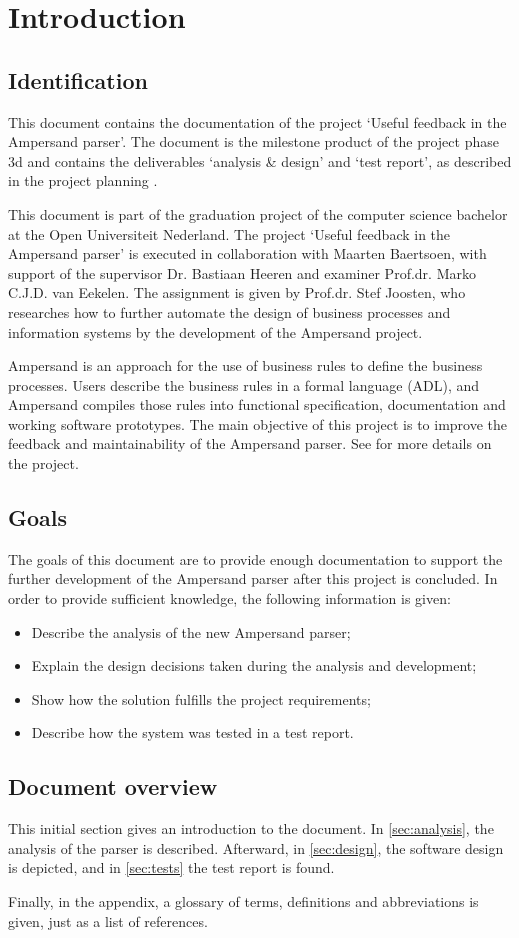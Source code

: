 \section{Introduction}
\subsection{Identification}
This document contains the documentation of the project `Useful feedback in the Ampersand parser'.
The document is the milestone product of the project phase 3d and contains the deliverables `analysis \& design' and `test report', as described in the project planning .

This document is part of the graduation project of the computer science bachelor at the Open Universiteit Nederland.
The project `Useful feedback in the Ampersand parser' is executed in collaboration with Maarten Baertsoen, with support of the supervisor Dr. Bastiaan Heeren and examiner Prof.dr. Marko C.J.D. van Eekelen.
The assignment is given by Prof.dr. Stef Joosten, who researches how to further automate the design of business processes and information systems by the development of the Ampersand project.

Ampersand is an approach for the use of business rules to define the business processes.
Users describe the business rules in a formal language (ADL), and Ampersand compiles those rules into functional specification, documentation and working software prototypes.
The main objective of this project is to improve the feedback and maintainability of the Ampersand parser.
See  for more details on the project.

\subsection{Goals}
The goals of this document are to provide enough documentation to support the further development of the Ampersand parser after this project is concluded.
In order to provide sufficient knowledge, the following information is given:
\begin{itemize}
  \item Describe the analysis of the new Ampersand parser;
  \item Explain the design decisions taken during the analysis and development;
  \item Show how the solution fulfills the project requirements;
  \item Describe how the system was tested in a test report.
\end{itemize}

\subsection{Document overview}
This initial section gives an introduction to the document.
In \autoref{sec:analysis}, the analysis of the parser is described.
Afterward, in \autoref{sec:design}, the software design is depicted, and in \autoref{sec:tests} the test report is found.

Finally, in the appendix, a glossary of terms, definitions and abbreviations is given, just as a list of references.
